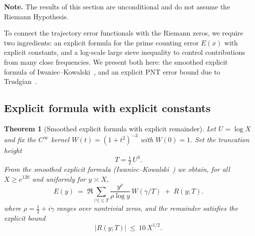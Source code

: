 \documentclass[11pt]{article}
\theoremstyle{plain}
\newtheorem{theorem}{Theorem}[section]
\theoremstyle{definition}
\theoremstyle{remark}
\begin{document}
\noindent\textbf{Note.} The results of this section are unconditional and do not assume the Riemann Hypothesis.

To connect the trajectory error functionals with the Riemann zeros, we require two ingredients: an explicit formula for the prime counting error $E(x)$ with explicit constants, and a log-scale large sieve inequality to control contributions from many close frequencies. We present both here: the smoothed explicit formula of Iwaniec--Kowalski~\cite[Theorem~5.12]{IwaniecKowalski}, and an explicit PNT error bound due to Trudgian~\cite[Theorem~1]{Trudgian2014}.

\subsection{Explicit formula with explicit constants}

\begin{theorem}[Smoothed explicit formula with explicit remainder]\label{thm:ExplicitRemainder}
Let $U=\log X$ and fix the $C^\infty$ kernel $W(t)=(1+t^2)^{-3}$ with $W(0)=1$. Set the truncation height
\[
T=\tfrac12\,U^3.
\]
From the smoothed explicit formula 
(Iwaniec--Kowalski~\cite[§5.5]{IwaniecKowalski}) we obtain, 
for all $X \ge e^{120}$ and uniformly for $y \asymp X$,
\begin{equation}\label{eq:ExplicitMain}
E(y) \;=\; \Re\!\sum_{|\gamma|\le T} \frac{y^{\rho}}{\rho \log y}\,W(\gamma/T) \;+\; R(y;T).
\end{equation}
where $\rho=\tfrac12+i\gamma$ ranges over nontrivial zeros, and the remainder satisfies the explicit bound
\begin{equation}\label{eq:RemainderTen}
|R(y;T)|\ \le\ 10\,X^{1/2}.
\end{equation}
\end{theorem}
\end{document}
